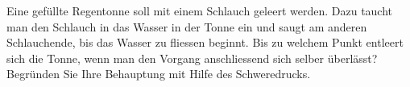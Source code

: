 Eine gefüllte Regentonne soll mit einem Schlauch geleert werden. Dazu taucht man den Schlauch in das Wasser in der Tonne ein und saugt am anderen Schlauchende, bis das Wasser zu fliessen beginnt. Bis zu welchem Punkt entleert sich die Tonne, wenn man den Vorgang anschliessend sich selber überlässt? Begründen Sie Ihre Behauptung mit Hilfe des Schweredrucks.
